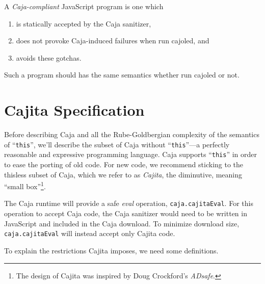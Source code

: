 \documentclass[letterpaper,twocolumn,10pt]{article}
\newcommand{\code}[1]{{\tt {#1}}}              %
\begin{document}
A \emph{Caja-compliant} JavaScript program is one which
\begin{enumerate}
  \item is statically accepted by the Caja sanitizer,
  \item does not provoke Caja-induced failures when run cajoled, and
  \item avoids these gotchas.
\end{enumerate}
Such a program should has the same semantics whether run cajoled or not.


\section{Cajita Specification}
\label{sec:cajita-spec}
Before describing Caja and all the Rube-Goldbergian complexity of the
semantics of ``\code{this}'', we'll describe the subset of Caja without 
``\code{this}''---a perfectly reasonable and expressive programming 
language. Caja supports ``\code{this}'' in order to ease the porting of old 
code. For new code, we recommend sticking to the thisless subset of Caja, 
which we refer to as \emph{Cajita}, the diminutive, meaning ``small 
box''\footnote{
%
The design of Cajita was inspired by Doug Crockford's \emph{ADsafe}.
%
}.

The Caja runtime will provide a safe \emph{eval} operation, \code{caja.cajitaEval}. For 
this operation to accept Caja code, the Caja sanitizer would need to be 
written in JavaScript and included in the Caja download. To minimize download 
size, \code{caja.cajitaEval} will instead accept only Cajita code.

To explain the restrictions Cajita imposes, we need some definitions.
\end{document}

